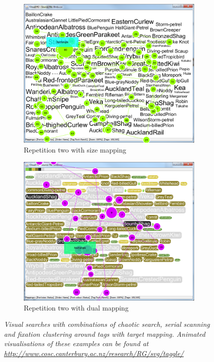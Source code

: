 \begin{figure}[!htb]
\begin{subfigure}{.5\textwidth}
  \centering
  \includegraphics[scale=0.25]{t2chaoticsearch1.png}
  \caption{Repetition two with size mapping}
\end{subfigure}%
\begin{subfigure}{.5\textwidth}
  \centering
  \includegraphics[scale=0.25]{t2chaoticsearch2.png}
  \caption{Repetition two with dual mapping}
\end{subfigure}
\caption{\textit{Visual searches with combinations of chaotic search, serial scanning and fixation clustering around tags with target mapping. Animated visualisations of these examples can be found at \url{http://www.cosc.canterbury.ac.nz/research/RG/svg/taggle/}}}
\label{fig:chaoticsearch}
\end{figure}

